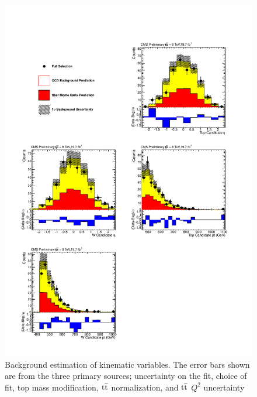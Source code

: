 \begin{figure}[htcb]
\centering
\includegraphics[width=.7\textwidth]{AN-14-049/figs/KinPlots_Data1.pdf}
\caption{Background estimation of kinematic variables.  
The error bars shown are from the three primary sources; uncertainty on the fit, choice of fit, top mass modification, $\mathrm{t\overline{t}}$ normalization, and $\mathrm{t\overline{t}}$ $Q^2$ uncertainty}
\label{figs:bskinplotsdata1}
\end{figure}  
\clearpage

